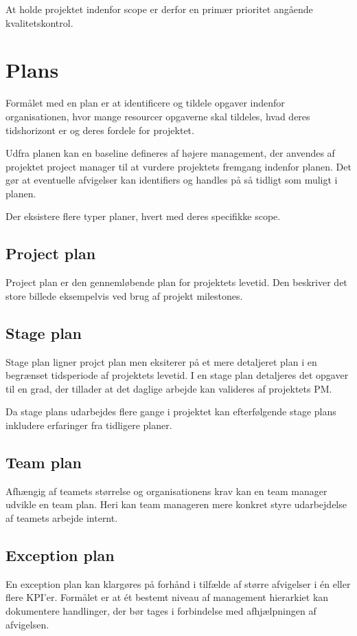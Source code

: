 At holde projektet indenfor scope er derfor en primær prioritet angående kvalitetskontrol.

\section{Plans}
\label{sec:plans}
Formålet med en plan er at identificere og tildele opgaver indenfor organisationen, hvor mange resourcer opgaverne skal tildeles, hvad deres tidshorizont er og deres fordele for projektet.

Udfra planen kan en baseline defineres af højere management, der anvendes af projektet project manager til at vurdere projektets fremgang indenfor planen. Det gør at eventuelle afvigelser kan identifiers og handles på så tidligt som muligt i planen.

Der eksistere flere typer planer, hvert med deres specifikke scope.

\subsection{Project plan}
Project plan er den gennemløbende plan for projektets levetid. Den beskriver det store billede eksempelvis ved brug af projekt milestones.

\subsection{Stage plan}
Stage plan ligner projct plan men eksiterer på et mere detaljeret plan i en begrænset tidsperiode af projektets levetid. I en stage plan detaljeres det opgaver til en grad, der tillader at det daglige arbejde kan valideres af projektets PM.

Da stage plans udarbejdes flere gange i projektet kan efterfølgende stage plans inkludere erfaringer fra tidligere planer.

\subsection{Team plan}
Afhængig af teamets størrelse og organisationens krav kan en team manager udvikle en team plan. Heri kan team manageren mere konkret styre udarbejdelse af teamets arbejde internt. 

\subsection{Exception plan}
En exception plan kan klargøres på forhånd i tilfælde af større afvigelser i én eller flere KPI'er. Formålet er at ét bestemt niveau af management hierarkiet kan dokumentere handlinger, der bør tages i forbindelse med afhjælpningen af afvigelsen.

